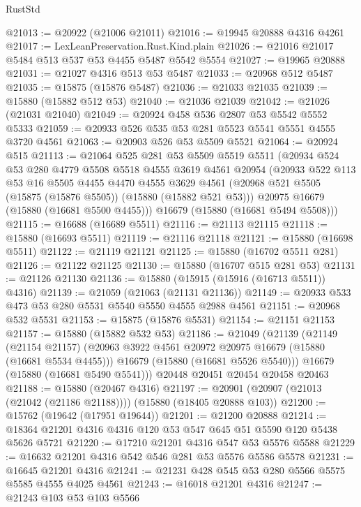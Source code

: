 \begin{lexlean}{RustStd}
\begin{coremodule}
@21013 := @20922 (@21006 @21011)
@21016 := @19945 @20888 @4316 @4261
@21017 := LexLeanPreservation.Rust.Kind.plain
@21026 := @21016 @21017 @5484 @513 @537 @53 @4455 @5487 @5542 @5554
@21027 := @19965 @20888
@21031 := @21027 @4316 @513 @53 @5487
@21033 := @20968 @512 @5487
@21035 := @15875 (@15876 @5487)
@21036 := @21033 @21035
@21039 := @15880 (@15882 @512 @53)
@21040 := @21036 @21039
@21042 := @21026 (@21031 @21040)
@21049 := @20924 @458 @536 @2807 @53 @5542 @5552 @5333
@21059 := @20933 @526 @535 @53 @281 @5523 @5541 @5551 @4555 @3720 @4561
@21063 := @20903 @526 @53 @5509 @5521
@21064 := @20924 @515
@21113 := @21064
    @525
    @281
    @53
    @5509
    @5519
    @5511
    (@20934
      @524
      @53
      @280
      @4779
      @5508
      @5518
      @4555
      @3619
      @4561
      @20954
      (@20933
        @522
        @113
        @53
        @16
        @5505
        @4455
        @4470
        @4555
        @3629
        @4561
        (@20968 @521 @5505 (@15875 (@15876 @5505)) (@15880 (@15882 @521 @53)))
        @20975
        @16679
        (@15880 (@16681 @5500 @4455)))
      @16679
      (@15880 (@16681 @5494 @5508)))
@21115 := @16688 (@16689 @5511)
@21116 := @21113 @21115
@21118 := @15880 (@16693 @5511)
@21119 := @21116 @21118
@21121 := @15880 (@16698 @5511)
@21122 := @21119 @21121
@21125 := @15880 (@16702 @5511 @281)
@21126 := @21122 @21125
@21130 := @15880 (@16707 @515 @281 @53)
@21131 := @21126 @21130
@21136 := @15880 (@15915 (@15916 (@16713 @5511)) @4316)
@21139 := @21059 (@21063 (@21131 @21136))
@21149 := @20933 @533 @473 @53 @280 @5531 @5540 @5550 @4555 @2988 @4561
@21151 := @20968 @532 @5531
@21153 := @15875 (@15876 @5531)
@21154 := @21151 @21153
@21157 := @15880 (@15882 @532 @53)
@21186 := @21049
    (@21139
      (@21149
        (@21154 @21157)
        (@20963 @3922 @4561 @20972 @20975 @16679 (@15880 (@16681 @5534 @4455)))
        @16679
        (@15880 (@16681 @5526 @5540)))
      @16679
      (@15880 (@16681 @5490 @5541)))
    @20448
    @20451
    @20454
    @20458
    @20463
@21188 := @15880 (@20467 @4316)
@21197 := @20901 (@20907 (@21013 (@21042 (@21186 @21188)))) (@15880 (@18405 @20888 @103))
@21200 := @15762 (@19642 (@17951 @19644))
@21201 := @21200 @20888
@21214 := @18364 @21201 @4316 @4316 @120 @53 @547 @645 @51 @5590 @120 @5438 @5626 @5721
@21220 := @17210 @21201 @4316 @547 @53 @5576 @5588
@21229 := @16632 @21201 @4316 @542 @546 @281 @53 @5576 @5586 @5578
@21231 := @16645 @21201 @4316
@21241 := @21231 @428 @545 @53 @280 @5566 @5575 @5585 @4555 @4025 @4561
@21243 := @16018 @21201 @4316
@21247 := @21243 @103 @53 @103 @5566

\end{coremodule}
\end{lexlean}

